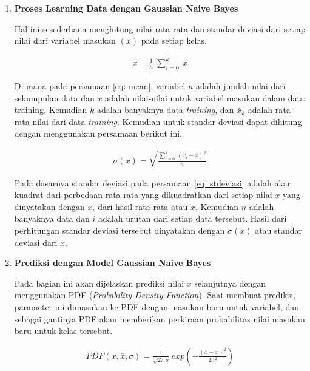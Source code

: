 \begin{subs}
\begin{enumerate}[label=\textbf{\arabic*).}]
		\item \textbf{Proses Learning Data dengan Gaussian Naive Bayes}
		
		Hal ini sesederhana menghitung nilai rata-rata dan standar deviasi dari setiap nilai dari variabel masukan $(x)$ pada setiap kelas.
		
		\begin{equation}\label{eq: mean}
		\begin{split}
		\bar x = \frac{1}{n}\ \sum_{i=0}^{k}\ x
		\end{split}
		\end{equation}
		
		Di mana pada persamaan \ref{eq: mean}, variabel $n$ adalah jumlah nilai dari sekumpulan data dan $x$ adalah nilai-nilai untuk variabel masukan dalam data training. Kemudian $k$ adalah banyaknya data \textit{training}, dan $\bar x_{k}$ adalah rata-rata nilai dari data \textit{training}. Kemudian untuk standar deviasi dapat dihitung dengan menggunakan persamaan berikut ini.
		
		\begin{equation}\label{eq: stdeviasi}
		\begin{split}
		\sigma(x) = \sqrt{\frac{\sum_{i = 0}^{k}\ (x_{i} - \bar{x})^{2}}{n}}
		\end{split}
		\end{equation}
		
		Pada dasarnya standar deviasi pada persamaan \ref{eq: stdeviasi} adalah akar kuadrat dari perbedaan rata-rata yang dikuadratkan dari setiap nilai $x$ yang dinyatakan dengan $x_{i}$ dari hasil rata-rata atau $\bar x$. Kemudian $n$ adalah banyaknya data dan $i$ adalah urutan dari setiap data tersebut. Hasil dari perhitungan standar deviasi tersebut dinyatakan dengan $\sigma(x)$ atau standar deviasi dari $x$.
	
		\item \textbf{Prediksi dengan Model Gaussian Naive Bayes}
	
		Pada bagian ini akan dijelaskan prediksi nilai $x$ selanjutnya dengan menggunakan  PDF (\textit{Probability Density Function}). Saat membuat prediksi, parameter ini dimasukan ke  PDF dengan masukan baru untuk variabel, dan sebagai gantinya  PDF akan memberikan perkiraan probabilitas nilai masukan baru untuk kelas tersebut.
		
		\begin{equation}\label{eq: nbayes_gaus_pdf}
		\begin{split}
		PDF(x, \bar{x}, \sigma) = \frac{1}{\sqrt{2 \pi} \sigma}\ exp \left(-\frac{(x - \bar{x})^2}{2 \sigma^2}\right)
		\end{split}
		\end{equation}
		

\end{enumerate}
\end{subs}
